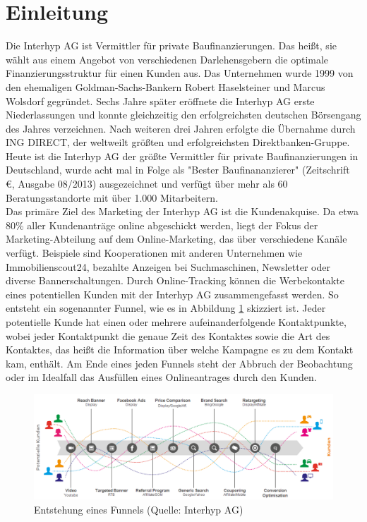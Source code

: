 \section{Einleitung}

Die Interhyp AG ist Vermittler für private Baufinanzierungen. Das heißt, sie wählt aus einem Angebot von verschiedenen Darlehensgebern die optimale Finanzierungsstruktur für einen Kunden aus. Das Unternehmen wurde 1999 von den ehemaligen Goldman-Sachs-Bankern Robert Haselsteiner und Marcus Wolsdorf gegründet. Sechs Jahre später eröffnete die Interhyp AG erste Niederlassungen und konnte gleichzeitig den erfolgreichsten deutschen Börsengang des Jahres verzeichnen. Nach weiteren drei Jahren erfolgte die Übernahme durch ING DIRECT, der weltweilt größten und erfolgreichsten Direktbanken-Gruppe. Heute ist die Interhyp AG der größte Vermittler für private Baufinanzierungen in Deutschland, wurde acht mal in Folge als "Bester Baufinananzierer" (Zeitschrift \euro, Ausgabe 08/2013) ausgezeichnet und verfügt über mehr als 60 Beratungsstandorte mit über 1.000 Mitarbeitern.\\
Das primäre Ziel des Marketing der Interhyp AG ist die Kundenakquise. Da etwa 80\% aller Kundenanträge online abgeschickt werden, liegt der Fokus der Marketing-Abteilung auf dem Online-Marketing, das über verschiedene Kanäle verfügt. Beispiele sind Kooperationen mit anderen Unternehmen wie Immobilienscout24, bezahlte Anzeigen bei Suchmaschinen, Newsletter oder diverse Bannerschaltungen. Durch Online-Tracking können die Werbekontakte eines potentiellen Kunden mit der Interhyp AG zusammengefasst werden. So entsteht ein sogenannter Funnel, wie es in Abbildung \ref{customerJourney} skizziert ist. Jeder potentielle Kunde hat einen oder mehrere aufeinanderfolgende Kontaktpunkte, wobei jeder Kontaktpunkt die genaue Zeit des Kontaktes sowie die Art des Kontaktes, das heißt die Information über welche Kampagne es zu dem Kontakt kam, enthält. Am Ende eines jeden Funnels steht der Abbruch der Beobachtung oder im Idealfall das Ausfüllen eines Onlineantrages durch den Kunden.
\begin{figure}[H]
    \centering\includegraphics[scale=0.5]{customerJourney.png}\caption[Entstehung eines Funnels]{Entstehung eines Funnels (Quelle: Interhyp AG)}\label{customerJourney}
\end{figure}
